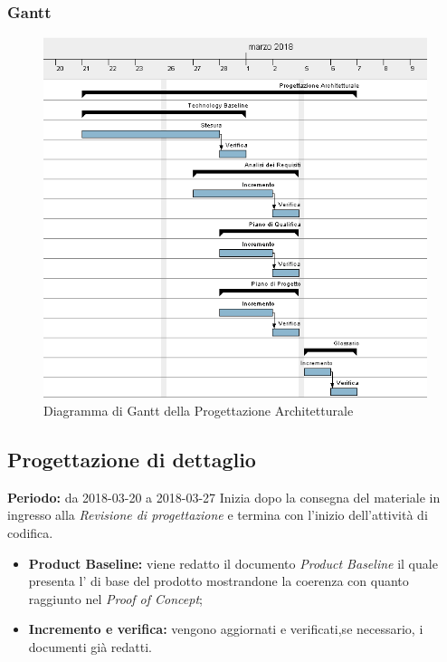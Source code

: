 \subsubsection{Gantt}
\begin{figure}[H]
	\centering 
	\includegraphics[width=1\textwidth]{images/Progettazione-Architetturale.png}
	\caption{Diagramma di Gantt della Progettazione Architetturale}
	\label{graficobello3} 
\end{figure}
\subsection{Progettazione di dettaglio}
    \textbf{Periodo:} da 2018-03-20 a 2018-03-27\Spazio
    Inizia dopo la consegna del materiale in ingresso alla \emph{Revisione di progettazione} e termina con l'inizio dell'attività di codifica.
    \begin{itemize}
    	\item \textbf{Product Baseline:} viene redatto il documento \emph{Product Baseline} il quale presenta l' di base del prodotto mostrandone la coerenza con quanto raggiunto nel \emph{Proof of Concept};
    	\item \textbf{Incremento e verifica:} vengono aggiornati e verificati,se necessario, i documenti già redatti.
    \end{itemize}
